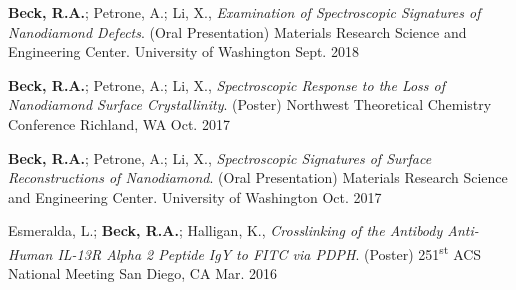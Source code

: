 \begin{cvpresentations}
\cvpresentation %
{\textbf{Beck, R.A.}; Petrone, A.; Li, X., \textit{Examination of Spectroscopic Signatures of Nanodiamond Defects}. (Oral Presentation) Materials Research Science and Engineering Center.}
{University of Washington} %
{Sept. 2018} %


\cvpresentation
{\textbf{Beck, R.A.}; Petrone, A.; Li, X., \textit{Spectroscopic Response to the Loss of Nanodiamond Surface Crystallinity}. (Poster) Northwest Theoretical Chemistry Conference}
{Richland, WA} %
{Oct. 2017} %


\cvpresentation
{\textbf{Beck, R.A.}; Petrone, A.; Li, X., \textit{Spectroscopic Signatures of Surface Reconstructions of Nanodiamond}. (Oral Presentation) Materials Research Science and Engineering Center.}
{University of Washington} %
{Oct. 2017} %




\cvpresentation
{Esmeralda, L.; \textbf{Beck, R.A.}; Halligan, K., \textit{Crosslinking of the Antibody Anti-Human IL-13R Alpha 2 Peptide IgY to FITC via PDPH}. (Poster) 251\textsuperscript{st} ACS National Meeting}
{San Diego, CA} %
{Mar. 2016} %


\end{cvpresentations}

